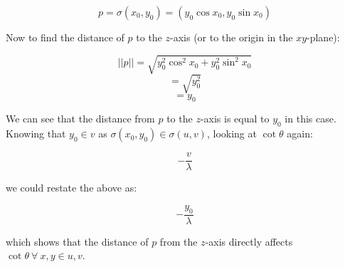 \documentclass[12pt]{article}
\newcommand{\norm}[1]
{
||#1||
}
\begin{document}
$$
p = \sigma(x_0,y_0) = (y_0 \cos x_0,y_0 \sin x_0)
$$

Now to find the distance of $p$ to the $z$-axis (or to the origin in the $xy$-plane):

$$
\norm{p} = \sqrt{y_0^2 \cos^2x_0 + y_0^2 \sin^2 x_0}
$$
$$
= \sqrt{y_0^2}
$$
$$
= y_0
$$

\clearpage

We can see that the distance from $p$ to the $z$-axis is equal to $y_0$ in this case. Knowing that $y_0 \in v$ as $\sigma(x_0,y_0) \in \sigma(u,v)$, looking at $\cot \theta$ again:

$$
-\frac{v}{\lambda}
$$

we could restate the above as:

$$
-\frac{y_0}{\lambda}
$$

which shows that the distance of $p$ from the $z$-axis directly affects $\cot \theta \ \forall \ x,y \in u,v$.
\end{document}
